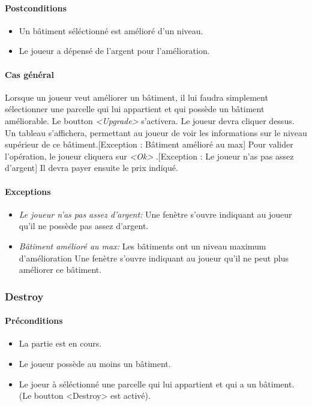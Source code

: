 \documentclass[a4paper,11pt]{report}
\begin{document}
\paragraph{Postconditions}
\begin{itemize}
 \item Un bâtiment séléctionné est amélioré d'un niveau.
 \item Le joueur a dépensé de l'argent pour l'amélioration.
\end{itemize}
\paragraph{Cas général}
Lorsque un joueur veut améliorer un bâtiment, il lui faudra simplement sélectionner une parcelle qui lui appartient et qui possède un bâtiment améliorable. Le boutton \og \textit{<Upgrade>} \fg s'activera. Le joueur devra cliquer dessus. Un tableau s'affichera, permettant au joueur de voir les informations sur le niveau supérieur de ce bâtiment.[Exception : Bâtiment amélioré au max] Pour valider l'opération, le joueur cliquera sur \og \textit{<Ok>} \fg.[Exception : Le joueur n'as pas assez d'argent] Il devra payer ensuite le prix indiqué.
\paragraph{Exceptions}
\begin{itemize}
 \item \textit{Le joueur n'as pas assez d'argent:}  Une fenètre s'ouvre indiquant au joueur qu'il ne possède pas assez d'argent.
 \item \textit{Bâtiment amélioré au max:}  Les bâtiments ont un niveau maximum d'amélioration Une fenètre s'ouvre indiquant au joueur qu'il ne peut plus améliorer ce bâtiment.
\end{itemize}
\subsubsection{Destroy}
\paragraph{Préconditions}
\begin{itemize}
 \item La partie est en cours.
 \item Le joueur possède au moins un bâtiment.
 \item Le joeur à séléctionné une parcelle qui lui appartient et qui a un bâtiment. (Le boutton <Destroy> est activé).
\end{itemize}
\end{document}
